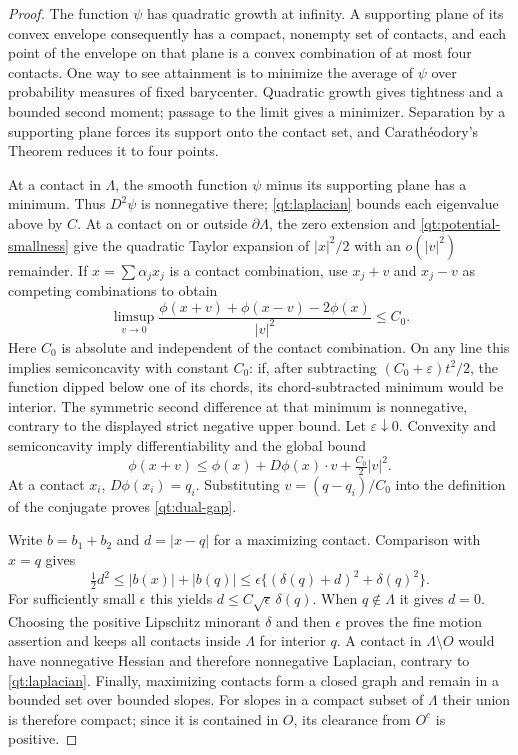 \begin{proof}
The function $\psi$ has quadratic growth at infinity.  A supporting
plane of its convex envelope consequently has a compact, nonempty set
of contacts, and each point of the envelope on that plane is a convex
combination of at most four contacts.  One way to see attainment is to
minimize the average of $\psi$ over probability measures of fixed
barycenter.  Quadratic growth gives tightness and a bounded second
moment; passage to the limit gives a minimizer.  Separation by a
supporting plane forces its support onto the contact set, and
Carath\'eodory's Theorem reduces it to four points.

At a contact in $\Lambda$, the smooth function $\psi$ minus its
supporting plane has a minimum.  Thus $D^2\psi$ is nonnegative there;
\eqref{qt:laplacian} bounds each eigenvalue above by $C$.  At a contact
on or outside $\partial\Lambda$, the zero extension and
\eqref{qt:potential-smallness} give the quadratic Taylor expansion of
$|x|^2/2$ with an $o(|v|^2)$ remainder.  If
$x=\sum\alpha_jx_j$ is a contact combination, use $x_j+v$ and $x_j-v$
as competing combinations to obtain
\[
 \limsup_{v\to0}
 \frac{\phi(x+v)+\phi(x-v)-2\phi(x)}{|v|^2}\leq C_0.
\]
Here $C_0$ is absolute and independent of the contact combination.
On any line this implies semiconcavity with constant $C_0$: if, after
subtracting $(C_0+\varepsilon)t^2/2$, the function dipped below one of
its chords, its chord-subtracted minimum would be interior.  The
symmetric second difference at that minimum is nonnegative, contrary
to the displayed strict negative upper bound.  Let $\varepsilon\downarrow0$.
Convexity and semiconcavity imply differentiability and the global bound
\[
 \phi(x+v)\leq\phi(x)+D\phi(x)\cdot v+\tfrac{C_0}2|v|^2.
\]
At a contact $x_i$, $D\phi(x_i)=q_i$.  Substituting
$v=(q-q_i)/C_0$ into the definition of the conjugate proves
\eqref{qt:dual-gap}.

Write $b=b_1+b_2$ and $d=|x-q|$ for a maximizing contact.  Comparison
with $x=q$ gives
\[
 \tfrac12d^2\leq |b(x)|+|b(q)|
 \leq\epsilon\{(\delta(q)+d)^2+\delta(q)^2\}.
\]
For sufficiently small $\epsilon$ this yields
$d\leq C\sqrt\epsilon\,\delta(q)$.  When $q\notin\Lambda$ it gives
$d=0$.  Choosing the positive Lipschitz minorant $\delta$ and then
$\epsilon$ proves the fine motion assertion and keeps all contacts
inside $\Lambda$ for interior $q$.  A contact in $\Lambda\setminus O$
would have nonnegative Hessian and therefore nonnegative Laplacian,
contrary to \eqref{qt:laplacian}.  Finally, maximizing contacts form a
closed graph and remain in a bounded set over bounded slopes.  For
slopes in a compact subset of $\Lambda$ their union is therefore
compact; since it is contained in $O$, its clearance from $O^c$ is
positive.
\end{proof}

